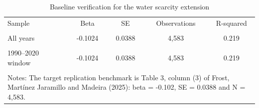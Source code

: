 \begin{table}[htbp]
\centering
\caption{Baseline verification for the water scarcity extension}
\label{tab:baseline}
\small
\begin{tabular}{lcccc}
\toprule
Sample & Beta & SE & Observations & R-squared \\\\
\midrule
All years & -0.1024 & 0.0388 & 4,583 & 0.219 \\\\
1990--2020 window & -0.1024 & 0.0388 & 4,583 & 0.219 \\\\
\bottomrule
\multicolumn{5}{p{0.92\textwidth}}{\footnotesize Notes: The target replication benchmark is Table 3, column (3) of Frost, Mart\'inez Jaramillo and Madeira (2025): beta = -0.102, SE = 0.0388 and N = 4,583.}
\end{tabular}
\end{table}
